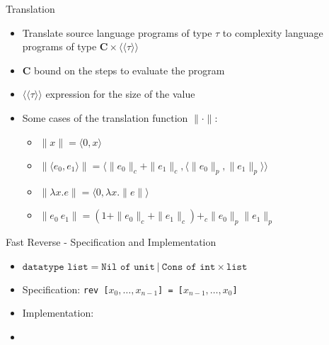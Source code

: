 \documentclass[pdf]{beamer}
\newcommand{\T}[1]{\texttt{#1}}
\newcommand{\LP}{\langle}
\newcommand{\RP}{\rangle}
\newcommand{\LL}{\langle\!\langle}
\newcommand{\RR}{\rangle\!\rangle}
\begin{document}
\begin{frame}{Translation}
  \begin{itemize}
    \item Translate source language programs of type $\tau$ to complexity language programs of type $\textbf{C}\times \LL \tau \RR$
    \vfill
    \item \textbf{C} bound on the steps to evaluate the program
    \vfill
    \item $\LL\tau\RR$ expression for the size of the value
    \vfill
    \item Some cases of the translation function $\|\cdot\|$:
      \begin{itemize}
        \item $\|x\| = \LP 0,x \RP$
        \item $\|\LP e_0,e_1 \RP\| = \LP \|e_0\|_c + \|e_1\|_c, \LP \|e_0\|_p,\|e_1\|_p\RP\RP$
      \item $\|\lambda x.e\| = \LP 0, \lambda x.\|e\|\RP$
      \item $\|e_0\ e_1\| = (1 + \|e_0\|_c + \|e_1\|_c) +_c \|e_0\|_p \|e_1\|_p$
      \end{itemize}
  \end{itemize}
\end{frame}


\begin{frame}{Fast Reverse - Specification and Implementation}
  \begin{itemize}
    \item
        $\T{datatype list} = \T{Nil of unit}\ |\ \T{Cons of int} \times \T{list}$
    \item
      Specification: \T{rev [$x_0,\dots,x_{n-1}$] = [$x_{n-1},\dots,x_0$]}
    \item
      Implementation:
      \usebox{\codebox}
    \item[]
      \lstfastreverse
  \end{itemize}
\end{frame}
\end{document}
